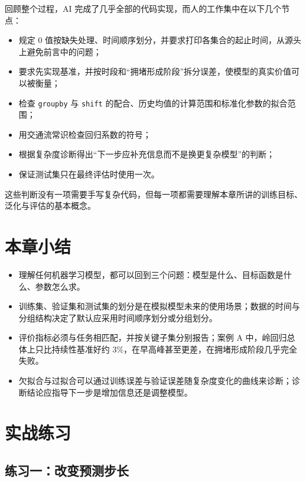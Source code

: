 回顾整个过程，AI 完成了几乎全部的代码实现，而人的工作集中在以下几个节点：

\begin{itemize}
  \item 规定 0 值按缺失处理、时间顺序划分，并要求打印各集合的起止时间，从源头上避免前言中的问题；
  \item 要求先实现基准，并按时段和“拥堵形成阶段”拆分误差，使模型的真实价值可以被衡量；
  \item 检查 \texttt{groupby} 与 \texttt{shift} 的配合、历史均值的计算范围和标准化参数的拟合范围；
  \item 用交通流常识检查回归系数的符号；
  \item 根据复杂度诊断得出“下一步应补充信息而不是换更复杂模型”的判断；
  \item 保证测试集只在最终评估时使用一次。
\end{itemize}

这些判断没有一项需要手写复杂代码，但每一项都需要理解本章所讲的训练目标、泛化与评估的基本概念。

\section{本章小结}

\begin{itemize}
  \item 理解任何机器学习模型，都可以回到三个问题：模型是什么、目标函数是什么、参数怎么求。
  \item 训练集、验证集和测试集的划分是在模拟模型未来的使用场景；数据的时间与分组结构决定了默认应采用时间顺序划分或分组划分。
  \item 评价指标必须与任务相匹配，并按关键子集分别报告；案例 A 中，岭回归总体上只比持续性基准好约 3\%，在早高峰甚至更差，在拥堵形成阶段几乎完全失败。
  \item 欠拟合与过拟合可以通过训练误差与验证误差随复杂度变化的曲线来诊断；诊断结论应指导下一步是增加信息还是调整模型。
\end{itemize}

\section{实战练习}

\subsection*{练习一：改变预测步长}

